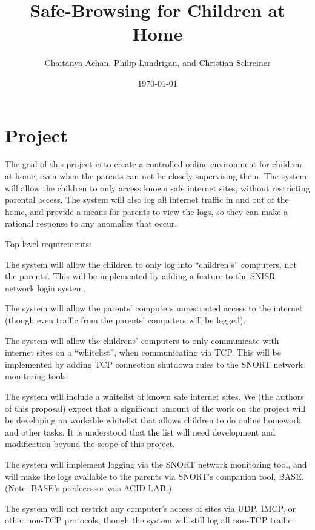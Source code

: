 \documentclass[12pt] {article}
\begin{document}
\title{Safe-Browsing for Children at Home}
\author{Chaitanya Achan, Philip Lundrigan, and Christian Schreiner}
\date \today
\maketitle
\setcounter{page}{1}

\section*{Project}

The goal of this project is to create a controlled online environment for
children at home, even when the parents can not be closely supervising them.
The system will allow the children to only access known safe internet sites,
without restricting parental access.  The system will also log all
internet traffic in and out of the home, and provide a means for parents to
view the logs, so they can make a rational response to any anomalies that
occur.

Top level requirements:

The system will allow the children to only log into ``children's'' computers,
not the parents'.  This will be implemented by adding a feature to the SNISR~\cite{snisr}
network login system.

The system will allow the parents' computers unrestricted access to the
internet (though even traffic from the parents' computers will be logged).

The system will allow the childrens' computers to only communicate with
internet sites on a ``whitelist'', when communicating via TCP.  This will be
implemented by adding TCP connection shutdown rules to the SNORT network
monitoring tools.

The system will include a whitelist of known safe internet sites.  We (the
authors of this proposal) expect that a significant amount of the work on
the project will be developing an workable whitelist that allows children to
do online homework and other tasks.  It is understood that the list will
need development and modification beyond the scope of this project.

The system will implement logging via the SNORT network monitoring tool, and
will make the logs available to the parents via SNORT's companion tool,
BASE.  (Note: BASE's predecessor was ACID LAB.)

The system will not restrict any computer's access of sites via UDP, IMCP,
or other non-TCP protocols, though the system will still log all non-TCP
traffic.
\end{document}
